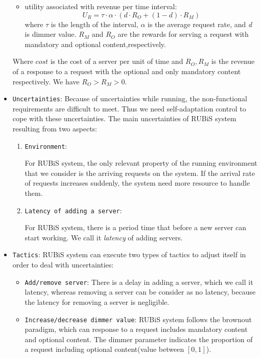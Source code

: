 \documentclass[sigconf]{acmart}
\begin{document}
\begin{itemize}
\begin{itemize}
\begin{equation}
		\end{equation}
		\item utility associated with revenue per time interval:
		\begin{equation}
		U_{R}=\tau \cdot \alpha \cdot (d\cdot R_{O}+(1-d)\cdot R_{M})
		\end{equation}
		where $\tau$ is the length of the interval, $\alpha$ is the average request rate, and \textit{d} is dimmer value. $R_{M}$ and $R_{O}$ are the rewards for serving a request with mandatory and optional content,respectively.
	\end{itemize}
	Where $cost$ is the cost of a server per unit of time and $R_{O}, R_{M}$ is the revenue of a response to a request with the optional and only mandatory content respectively. We have $R_{O}>R_{M}>0$.
	
	\item {\verb|Uncertainties|}:
	Because of uncertainties while running, the non-functional requirements are difficult to meet. Thus we need self-adaptation control to cope with these uncertainties.
	The main uncertainties of RUBiS system resulting from two aspects:
	\begin{enumerate}
		\item {\verb|Environment|}:
		
		 For RUBiS system, the only relevant property of the running environment that we consider is the arriving requests on the system. If the arrival rate of requests increases suddenly, the system need more resource to handle them.
		\item {\verb|Latency of adding a server|}:
		
		 For RUBiS system, there is a period time that before a new server can start working. We call it \textit{latency} of adding servers. 
	\end{enumerate}
	\item {\verb|Tactics|}:
	RUBiS system can execute two types of tactics to adjust itself in order to deal with uncertainties:
	\begin{itemize}
		\item {\verb|Add/remove server|}:
		 There is a delay in adding a server, which we call it latency, whereas removing a server can be consider as no latency, because the latency for removing a server is negligible.
		\item  {\verb|Increase/decrease dimmer value|}:
		 RUBiS system follows the brownout paradigm\cite{brownout}, which can response to a request includes mandatory content and optional content. The dimmer parameter indicates the proportion of a request including optional content(value between $[0,1]$).
	\end{itemize}

\end{itemize}
\end{document}
